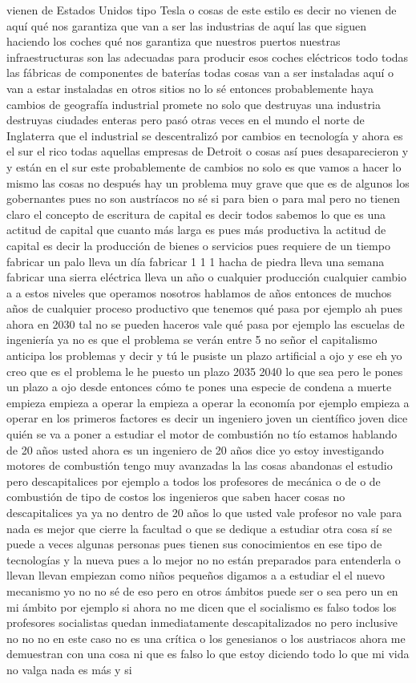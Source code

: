 vienen de Estados Unidos tipo Tesla o cosas de este estilo es decir no vienen de aquí qué nos garantiza que van a ser las industrias de aquí las que siguen haciendo los coches qué nos garantiza que nuestros puertos nuestras infraestructuras son las adecuadas para producir esos coches eléctricos todo todas las fábricas de componentes de baterías todas cosas van a ser instaladas aquí o van a estar instaladas en otros sitios no lo sé entonces probablemente haya cambios de geografía industrial promete no solo que destruyas una industria destruyas ciudades enteras pero pasó otras veces en el mundo el norte de Inglaterra que el industrial se descentralizó por cambios en tecnología y ahora es el sur el rico todas aquellas empresas de Detroit o cosas así pues desaparecieron y y están en el sur este probablemente de cambios no solo es que vamos a hacer lo mismo las cosas no después hay un problema muy grave que que es de algunos los gobernantes pues no son austríacos no sé si para bien o para mal pero no tienen claro el concepto de escritura de capital es decir todos sabemos lo que es una actitud de capital que cuanto más larga es pues más productiva la actitud de capital es decir la producción de bienes o servicios pues requiere de un tiempo fabricar un palo lleva un día fabricar 1 1 1 hacha de piedra lleva una semana fabricar una sierra eléctrica lleva un año o cualquier producción cualquier cambio a a estos niveles que operamos nosotros hablamos de años entonces de muchos años de cualquier proceso productivo que tenemos qué pasa por ejemplo ah pues ahora en 2030 tal no se pueden haceros vale qué pasa por ejemplo las escuelas de ingeniería ya no es que el problema se verán entre 5 no señor el capitalismo anticipa los problemas y decir y tú le pusiste un plazo artificial a ojo y ese eh yo creo que es el problema le he puesto un plazo 2035 2040 lo que sea pero le pones un plazo a ojo desde entonces cómo te pones una especie de condena a muerte empieza empieza a operar la empieza a operar la economía por ejemplo empieza a operar en los primeros factores es decir un ingeniero joven un científico joven dice quién se va a poner a estudiar el motor de combustión no tío estamos hablando de 20 años usted ahora es un ingeniero de 20 años dice yo estoy investigando motores de combustión tengo muy avanzadas la las cosas abandonas el estudio pero descapitalices por ejemplo a todos los profesores de mecánica o de o de combustión de tipo de costos los ingenieros que saben hacer cosas no descapitalices ya ya no dentro de 20 años lo que usted vale profesor no vale para nada es mejor que cierre la facultad o que se dedique a estudiar otra cosa sí se puede a veces algunas personas pues tienen sus conocimientos en ese tipo de tecnologías y la nueva pues a lo mejor no no están preparados para entenderla o llevan llevan empiezan como niños pequeños digamos a a estudiar el el nuevo mecanismo yo no no sé de eso pero en otros ámbitos puede ser o sea pero un en mi ámbito por ejemplo si ahora no me dicen que el socialismo es falso todos los profesores socialistas quedan inmediatamente descapitalizados no pero inclusive no no no en este caso no es una crítica o los genesianos o los austriacos ahora me demuestran con una cosa ni que es falso lo que estoy diciendo todo lo que mi vida no valga nada es más y si 